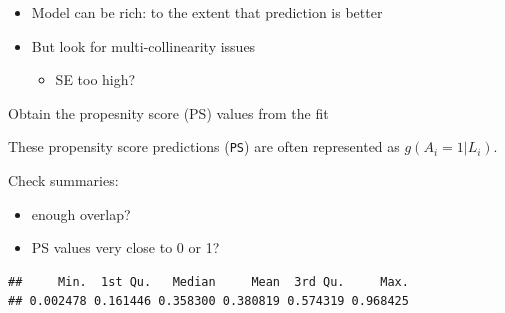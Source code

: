 \documentclass[
]{book}
\newenvironment{Shaded}{\begin{snugshade}}{\end{snugshade}}
\newcommand{\AttributeTok}[1]{\textcolor[rgb]{0.77,0.63,0.00}{#1}}
\newcommand{\FunctionTok}[1]{\textcolor[rgb]{0.00,0.00,0.00}{#1}}
\newcommand{\NormalTok}[1]{#1}
\newcommand{\OtherTok}[1]{\textcolor[rgb]{0.56,0.35,0.01}{#1}}
\newcommand{\SpecialCharTok}[1]{\textcolor[rgb]{0.00,0.00,0.00}{#1}}
\newcommand{\StringTok}[1]{\textcolor[rgb]{0.31,0.60,0.02}{#1}}
\providecommand{\tightlist}{%
  \setlength{\itemsep}{0pt}\setlength{\parskip}{0pt}}
\begin{document}
\begin{itemize}
\tightlist
\item
  Model can be rich: to the extent that prediction is better
\item
  But look for multi-collinearity issues

  \begin{itemize}
  \tightlist
  \item
    SE too high?
  \end{itemize}
\end{itemize}

Obtain the propesnity score (PS) values from the fit

\begin{Shaded}
\end{Shaded}

\begin{rmdcomment}
These propensity score predictions (\texttt{PS}) are often represented
as \(g(A_i=1|L_i)\).
\end{rmdcomment}

Check summaries:

\begin{itemize}
\tightlist
\item
  enough overlap?
\item
  PS values very close to 0 or 1?
\end{itemize}

\begin{Shaded}
\end{Shaded}

\begin{verbatim}
##     Min.  1st Qu.   Median     Mean  3rd Qu.     Max. 
## 0.002478 0.161446 0.358300 0.380819 0.574319 0.968425
\end{verbatim}

\begin{Shaded}
\end{Shaded}
\end{document}
